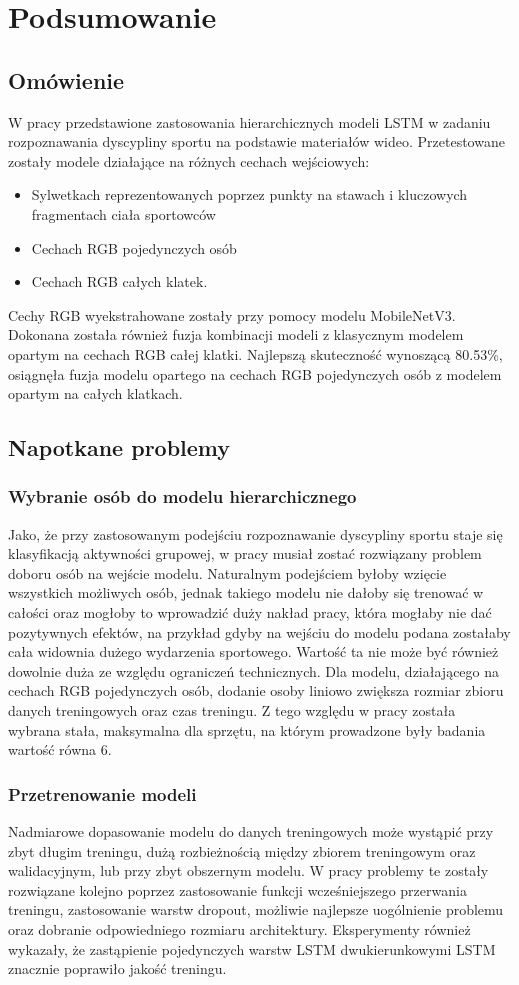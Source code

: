\newpage
\section{Podsumowanie}
\subsection{Omówienie}
W pracy przedstawione zastosowania hierarchicznych modeli LSTM w zadaniu rozpoznawania dyscypliny sportu na podstawie materiałów wideo. Przetestowane zostały modele działające na różnych cechach wejściowych: 
\begin{itemize}
    \item Sylwetkach reprezentowanych poprzez punkty na stawach i kluczowych fragmentach ciała sportowców
    \item Cechach RGB pojedynczych osób
    \item Cechach RGB całych klatek. 
\end{itemize}
Cechy RGB wyekstrahowane zostały przy pomocy modelu MobileNetV3. 
Dokonana została również fuzja kombinacji modeli z klasycznym modelem opartym na cechach RGB całej klatki. Najlepszą skuteczność wynoszącą 80.53\%, osiągnęła fuzja modelu opartego na cechach RGB pojedynczych osób z modelem opartym na całych klatkach.
\subsection{Napotkane problemy}
\subsubsection{Wybranie osób do modelu hierarchicznego}
Jako, że przy zastosowanym podejściu rozpoznawanie dyscypliny sportu staje się klasyfikacją aktywności grupowej, w pracy musiał zostać rozwiązany problem doboru osób na wejście modelu. Naturalnym podejściem byłoby wzięcie wszystkich możliwych osób, jednak takiego modelu nie dałoby się trenować w całości oraz mogłoby to wprowadzić duży nakład pracy, która mogłaby nie dać pozytywnych efektów, na przykład gdyby na wejściu do modelu podana zostałaby cała widownia dużego wydarzenia sportowego. Wartość ta nie może być również dowolnie duża ze względu ograniczeń technicznych. Dla modelu, działającego na cechach RGB pojedynczych osób, dodanie osoby liniowo zwiększa rozmiar zbioru danych treningowych oraz czas treningu. Z tego względu w pracy została wybrana stała, maksymalna dla sprzętu, na którym prowadzone były badania wartość równa 6. 
\subsubsection{Przetrenowanie modeli}
Nadmiarowe dopasowanie modelu do danych treningowych może wystąpić przy zbyt długim treningu, dużą rozbieżnością między zbiorem treningowym oraz walidacyjnym, lub przy zbyt obszernym modelu. W pracy problemy te zostały rozwiązane kolejno poprzez zastosowanie funkcji wcześniejszego przerwania treningu, zastosowanie warstw dropout, możliwie najlepsze uogólnienie problemu oraz dobranie odpowiedniego rozmiaru architektury. Eksperymenty również wykazały, że zastąpienie pojedynczych warstw LSTM dwukierunkowymi LSTM znacznie poprawiło jakość treningu.  

